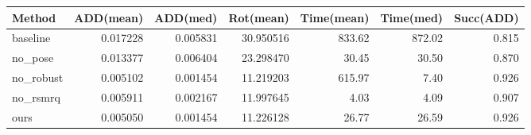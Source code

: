 \begin{tabular}{lrrrrrr}
\hline
Method & ADD(mean) & ADD(med) & Rot(mean) & Time(mean) & Time(med) & Succ(ADD) \\
\hline
baseline & 0.017228 & 0.005831 & 30.950516 & 833.62 & 872.02 & 0.815 \\
no_pose & 0.013377 & 0.006404 & 23.298470 & 30.45 & 30.50 & 0.870 \\
no_robust & 0.005102 & 0.001454 & 11.219203 & 615.97 & 7.40 & 0.926 \\
no_rsmrq & 0.005911 & 0.002167 & 11.997645 & 4.03 & 4.09 & 0.907 \\
ours & 0.005050 & 0.001454 & 11.226128 & 26.77 & 26.59 & 0.926 \\
\hline
\end{tabular}